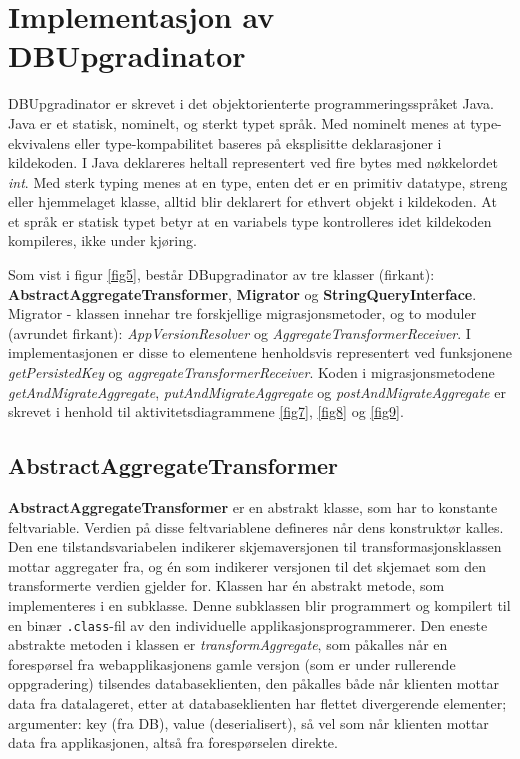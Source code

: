 \section{Implementasjon av DBUpgradinator}

DBUpgradinator er skrevet i det objektorienterte programmeringsspråket Java. Java er et statisk, nominelt, og sterkt typet språk. Med nominelt menes at type-ekvivalens eller type-kompabilitet baseres på eksplisitte deklarasjoner i kildekoden. I Java deklareres heltall representert ved fire bytes med nøkkelordet \emph{int}. Med sterk typing menes at en type, enten det er en primitiv datatype, streng eller hjemmelaget klasse, alltid blir deklarert for ethvert objekt i kildekoden. At et språk er statisk typet betyr at en variabels type kontrolleres idet kildekoden kompileres, ikke under kjøring.

Som vist i figur \ref{fig5}, består DBupgradinator av tre klasser (firkant): \textbf{AbstractAggregateTransformer}, \textbf{Migrator} og \textbf{StringQueryInterface}. Migrator - klassen innehar tre forskjellige migrasjonsmetoder, og to moduler (avrundet firkant): \emph{AppVersionResolver} og \emph{AggregateTransformerReceiver}. I implementasjonen er disse to elementene henholdsvis representert ved funksjonene \emph{getPersistedKey} og \emph{aggregateTransformerReceiver}. Koden i migrasjonsmetodene \emph{getAndMigrateAggregate}, \emph{putAndMigrateAggregate} og \emph{postAndMigrateAggregate} er skrevet i henhold til aktivitetsdiagrammene \ref{fig7}, \ref{fig8} og \ref{fig9}.

\subsection{AbstractAggregateTransformer}



\textbf{AbstractAggregateTransformer} er en abstrakt klasse, som har to konstante feltvariable. Verdien på disse feltvariablene defineres når dens konstruktør kalles. Den ene tilstandsvariabelen indikerer skjemaversjonen til transformasjonsklassen mottar aggregater fra, og én som indikerer versjonen til det skjemaet som den transformerte verdien gjelder for. Klassen har én abstrakt metode, som implementeres i en subklasse. Denne subklassen blir programmert og kompilert til en binær \texttt{.class}-fil av den individuelle applikasjonsprogrammerer. Den eneste abstrakte metoden i klassen er \emph{transformAggregate}, som påkalles når en forespørsel fra webapplikasjonens gamle versjon (som er under rullerende oppgradering) tilsendes databaseklienten, den påkalles både når klienten mottar data fra datalageret, etter at databaseklienten har flettet divergerende elementer; argumenter: key (fra DB), value (deserialisert), så vel som når klienten mottar data fra applikasjonen, altså fra forespørselen direkte.

